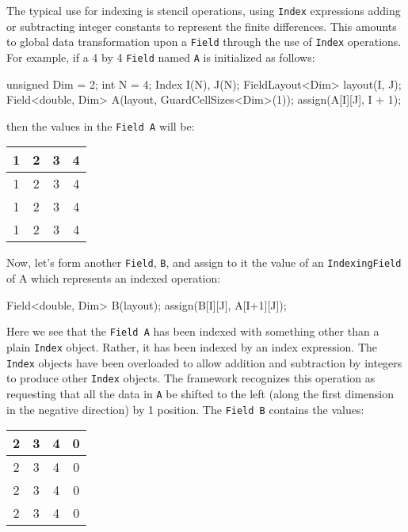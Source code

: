The typical use for indexing is stencil operations, using \texttt{Index} expressions adding or subtracting integer constants to represent the finite differences. This amounts to global data transformation upon a \texttt{Field} through the use of \texttt{Index} operations. For example, if a 4 by 4 \texttt{Field} named \texttt{A} is initialized as follows: \\
\begin{code}
unsigned Dim = 2;
int N = 4;
Index I(N), J(N);
FieldLayout<Dim> layout(I, J);
Field<double, Dim> A(layout, GuardCellSizes<Dim>(1));
assign(A[I][J], I + 1);
\end{code}
then the values in the \texttt{Field A} will be:
%
   \begin{center}
        \begin{tabular}{|c|c|c|c|}
        \hline
        1 & 2 & 3 & 4 \\        \hline
        1 & 2 & 3 & 4 \\        \hline
        1 & 2 & 3 & 4 \\        \hline
        1 & 2 & 3 & 4 \\        \hline
        \end{tabular}
   \label{tbl:t2}
   \end{center}

Now, let's form another \texttt{Field}, \texttt{B}, and assign to it the value of an \texttt{IndexingField} of A which represents an indexed operation:
\begin{smallcode}
Field<double, Dim> B(layout);
assign(B[I][J], A[I+1][J]);
\end{smallcode}

Here we see that the \texttt{Field A} has been indexed with something other than a plain \texttt{Index} object. Rather, it has been indexed by an index expression. The \texttt{Index} objects have been overloaded to allow addition and subtraction by integers to produce other \texttt{Index} objects. The framework recognizes this operation as requesting that all the data in \texttt{A} be shifted to the left (along the first dimension in the negative direction) by 1 position. The \texttt{Field B} contains the values:
%
   \begin{center}
        \begin{tabular}{|c|c|c|c|}
        \hline
        2 & 3 & 4 & 0 \\        \hline
        2 & 3 & 4 & 0 \\        \hline
        2 & 3 & 4 & 0 \\        \hline
        2 & 3 & 4 & 0 \\        \hline
        \end{tabular}
   \label{tbl:t2}
   \end{center}

